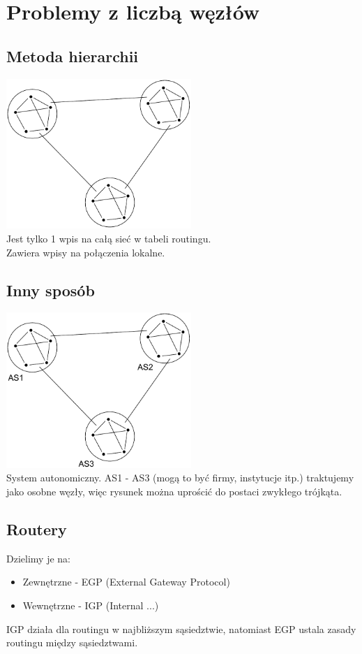 	\section{Problemy z liczbą węzłów}
		\subsection{Metoda hierarchii}
			\includegraphics[width=7.0cm]{./images/image46.pdf}\\
			Jest tylko 1 wpis na całą sieć w tabeli routingu.\\
			Zawiera wpisy na połączenia lokalne.
		\subsection{Inny sposób}
			\includegraphics[width=7.0cm]{./images/image47.pdf}\\
			System autonomiczny. AS1 - AS3 (mogą to być firmy, instytucje itp.) traktujemy jako osobne węzły, więc rysunek można uprościć do postaci zwykłego trójkąta.
		\subsection{Routery}
			Dzielimy je na:
			\begin{itemize}
				\item Zewnętrzne - EGP (External Gateway Protocol)
				\item Wewnętrzne - IGP (Internal ...)
			\end{itemize}
			IGP działa dla routingu w najbliższym sąsiedztwie, natomiast EGP ustala zasady routingu między sąsiedztwami.
